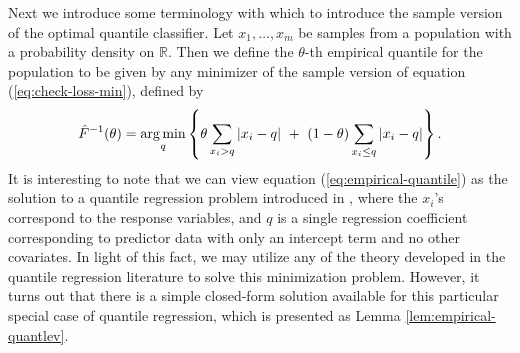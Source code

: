 Next we introduce some terminology with which to introduce the sample version of
the optimal quantile classifier.  Let $x_1, \dots, x_m$ be samples from a
population with a probability density on $\mathbb{R}$.  Then we define the
$\theta$-th empirical quantile for the population to be given by any minimizer
of the sample version of equation (\ref{eq:check-loss-min}), defined by
\begin{equation}
  \label{eq:empirical-quantile}
  \hat{F}^{-1} (\theta) = \operatorname*{arg\,min}_q \left\{
    \theta \sum_{ x_{i} > q } |x_{i} - q| ~+~
    (1 - \theta) \sum_{ x_{i} \leq q } |x_{i} - q|
  \right\}.
\end{equation}
It is interesting to note that we can view equation
(\ref{eq:empirical-quantile}) as the solution to a quantile regression problem
introduced in \cite{koenker1978}, where the $x_i$'s correspond to the response
variables, and $q$ is a single regression coefficient corresponding to predictor
data with only an intercept term and no other covariates.  In light of this
fact, we may utilize any of the theory developed in the quantile regression
literature to solve this minimization problem.  However, it turns out that there
is a simple closed-form solution available for this particular special case of
quantile regression, which is presented as Lemma \ref{lem:empirical-quantlev}.

